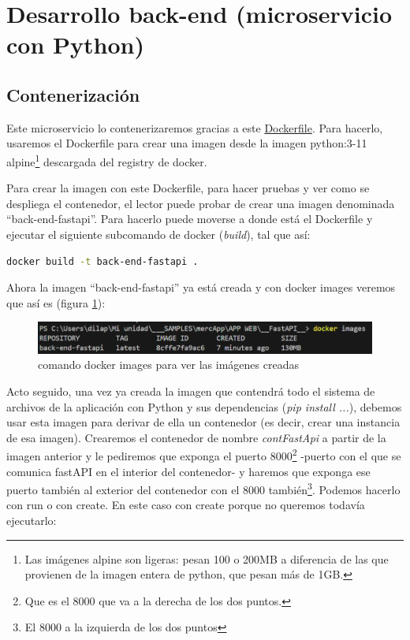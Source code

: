 \documentclass[a4paper,12pt]{report}
\begin{document}
			
			
			
			

			
	\section{Desarrollo back-end (microservicio con Python)}
	
	\subsection{Contenerización}
	
	Este microservicio lo contenerizaremos gracias a este \href{https://github.com/blackcub3s/mercApp/tree/main/APP%20WEB/__FastAPI__/Dockerfile}{Dockerfile}. Para hacerlo, usaremos el Dockerfile para crear una imagen desde la imagen python:3-11 alpine\footnote{Las imágenes alpine son ligeras: pesan 100 o 200MB a diferencia de las que provienen de la imagen entera de python, que pesan más de 1GB.} descargada del registry de docker. 
	
	Para crear la imagen con este Dockerfile, para hacer pruebas y ver como se despliega el contenedor, el lector puede probar de crear una imagen denominada ``back-end-fastapi''. Para hacerlo puede moverse a donde está el Dockerfile y ejecutar el siguiente subcomando de docker (\textit{build}), tal que así:
	
	\begin{lstlisting}[language=bash]
		docker build -t back-end-fastapi .
	\end{lstlisting}
	
		Ahora la imagen ``back-end-fastapi'' ya está creada y con docker images veremos que así es (figura \ref{fig:dockerimages}):
	\FloatBarrier
	\begin{figure}[H]
		\centering
		\caption{comando docker images para ver las imágenes creadas}
		\label{fig:dockerimages}
		\includegraphics[width=1\linewidth]{img/dockerImages}
	\end{figure}
	\FloatBarrier
	

	
	Acto seguido, una vez ya creada la imagen que contendrá todo el sistema de archivos de la aplicación con Python y sus dependencias (\textit{pip install ...}), debemos usar esta imagen para derivar de ella un contenedor (es decir, crear una instancia de esa imagen). Crearemos el contenedor de nombre \textit{contFastApi} a partir de la imagen anterior y le pediremos que exponga el puerto 8000\footnote{Que es el 8000 que va a la derecha de los dos puntos.} -puerto con el que se comunica fastAPI en el interior del contenedor- y haremos que exponga ese puerto también al exterior del contenedor con el 8000 también\footnote{El 8000 a la izquierda de los dos puntos}. Podemos hacerlo con run o con create. En este caso con create porque no queremos todavía ejecutarlo:
	
\end{document}
